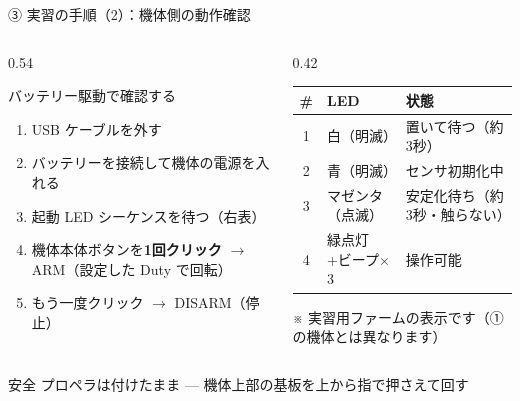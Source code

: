 \begin{frame}{③ 実習の手順（2）：機体側の動作確認}
  \begin{columns}[T]
    \begin{column}{0.54\textwidth}
      \begin{block}{バッテリー駆動で確認する}
        \begin{enumerate}\small
          \item USB ケーブルを外す
          \item バッテリーを接続して機体の電源を入れる
          \item 起動 LED シーケンスを待つ（右表）
          \item 機体本体ボタンを\textbf{1回クリック} $\to$ ARM（設定した Duty で回転）
          \item もう一度クリック $\to$ DISARM（停止）
        \end{enumerate}
      \end{block}
    \end{column}
    \begin{column}{0.42\textwidth}
      \begin{table}
        \centering\scriptsize
        \setlength{\tabcolsep}{2pt}
        \begin{tabular}{@{}c p{19mm} p{20mm}@{}}
          \hline
          \# & LED & 状態 \\
          \hline
          1 & 白（明滅） & 置いて待つ（約3秒） \\
          2 & 青（明滅） & センサ初期化中 \\
          3 & マゼンタ（点滅） & 安定化待ち（約3秒・触らない） \\
          4 & 緑点灯+ビープ$\times$3 & 操作可能 \\
          \hline
        \end{tabular}
      \end{table}
      {\tiny ※ 実習用ファームの表示です（①の機体とは異なります）}
    \end{column}
  \end{columns}

  \vspace{0.4em}

  \begin{alertblock}{安全}
    プロペラは付けたまま --- 機体上部の基板を上から指で押さえて回す
  \end{alertblock}
\end{frame}

